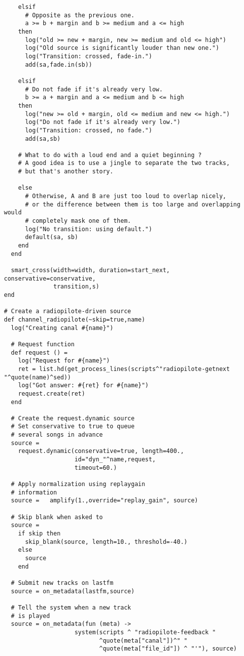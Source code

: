 \begin{verbatim}
    elsif
      # Opposite as the previous one.
      a >= b + margin and b >= medium and a <= high
    then
      log("old >= new + margin, new >= medium and old <= high")
      log("Old source is significantly louder than new one.")
      log("Transition: crossed, fade-in.")
      add(sa,fade.in(sb))

    elsif
      # Do not fade if it's already very low.
      b >= a + margin and a <= medium and b <= high
    then
      log("new >= old + margin, old <= medium and new <= high.")
      log("Do not fade if it's already very low.")
      log("Transition: crossed, no fade.")
      add(sa,sb)

    # What to do with a loud end and a quiet beginning ?
    # A good idea is to use a jingle to separate the two tracks,
    # but that's another story.

    else
      # Otherwise, A and B are just too loud to overlap nicely,
      # or the difference between them is too large and overlapping would
      # completely mask one of them.
      log("No transition: using default.")
      default(sa, sb)
    end
  end

  smart_cross(width=width, duration=start_next, conservative=conservative,
              transition,s)
end

# Create a radiopilote-driven source
def channel_radiopilote(~skip=true,name)
  log("Creating canal #{name}")
  
  # Request function
  def request () = 
    log("Request for #{name}")
    ret = list.hd(get_process_lines(scripts^"radiopilote-getnext "^quote(name)^sed))
    log("Got answer: #{ret} for #{name}")
    request.create(ret)
  end

  # Create the request.dynamic source
  # Set conservative to true to queue
  # several songs in advance
  source = 
    request.dynamic(conservative=true, length=400.,
                    id="dyn_"^name,request, 
                    timeout=60.)
 
  # Apply normalization using replaygain 
  # information
  source =   amplify(1.,override="replay_gain", source)

  # Skip blank when asked to
  source = 
    if skip then
      skip_blank(source, length=10., threshold=-40.)
    else
      source
    end

  # Submit new tracks on lastfm
  source = on_metadata(lastfm,source)
  
  # Tell the system when a new track
  # is played
  source = on_metadata(fun (meta) ->
                    system(scripts ^ "radiopilote-feedback "
                           ^quote(meta["canal"])^" "
                           ^quote(meta["file_id"]) ^ "'"), source)


\end{verbatim}
